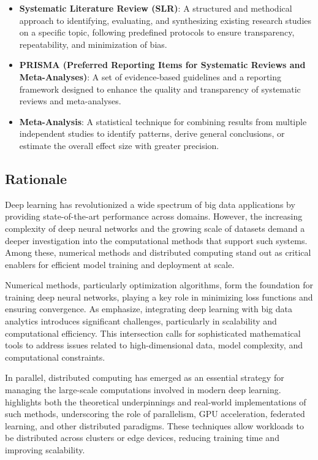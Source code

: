 \documentclass[format=acmsmall, natbib=true, citestyle=acmauthoryear]{acmart}
\begin{document}
\begin{itemize}
    \item \textbf{Systematic Literature Review (SLR)}: A structured and methodical approach to identifying, evaluating, and synthesizing existing research studies on a specific topic, following predefined protocols to ensure transparency, repeatability, and minimization of bias.
    \item \textbf{PRISMA (Preferred Reporting Items for Systematic Reviews and Meta-Analyses)}: A set of evidence-based guidelines and a reporting framework designed to enhance the quality and transparency of systematic reviews and meta-analyses.
    \item \textbf{Meta-Analysis}: A statistical technique for combining results from multiple independent studies to identify patterns, derive general conclusions, or estimate the overall effect size with greater precision.
\end{itemize}

\subsection{Rationale}\label{subsec:rationale}
Deep learning has revolutionized a wide spectrum of big data applications by providing state-of-the-art performance across domains.
However, the increasing complexity of deep neural networks and the growing scale of datasets demand a deeper investigation into
the computational methods that support such systems. Among these, numerical methods and distributed computing stand out as critical
enablers for efficient model training and deployment at scale.

Numerical methods, particularly optimization algorithms, form the foundation for training deep neural networks, playing a key role
in minimizing loss functions and ensuring convergence. As \citet{najafabadi2015deep} emphasize, integrating deep learning with
big data analytics introduces significant challenges, particularly in scalability and computational efficiency.
This intersection calls for sophisticated mathematical tools to address issues related to high-dimensional data, model complexity,
and computational constraints.

In parallel, distributed computing has emerged as an essential strategy for managing the large-scale computations involved in
modern deep learning. \citet{yan2023computational} highlights both the theoretical underpinnings and real-world implementations of such methods,
underscoring the role of parallelism, GPU acceleration, federated learning, and other distributed paradigms.
These techniques allow workloads to be distributed across clusters or edge devices, reducing training time and improving scalability.
\end{document}
